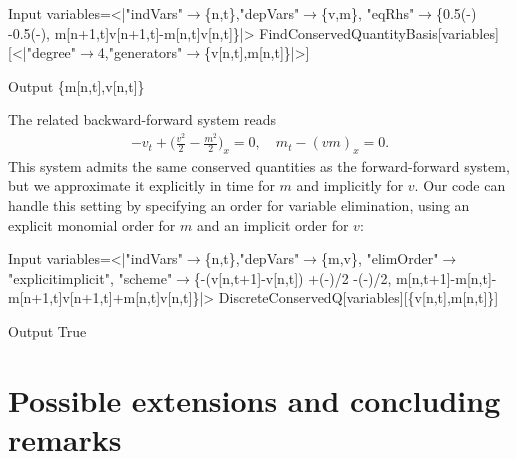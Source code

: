 \documentclass[runningheads]{llncs}
\newcommand{\1}{\chi}
\begin{document}
\begin{example}
	\begin{small}
		\begin{mmaCell}[moredefined={variables, PartialDVarD, FindConservedQuantityBasis}]{Input}
  variables=<|"indVars"\(\pmb{\to}\)\{n,t\},"depVars"\(\pmb{\to}\)\{v,m\},
  "eqRhs"\(\pmb{\to}\)\{0.5(-)
  -0.5(-),
  m[n+1,t]v[n+1,t]-m[n,t]v[n,t]\}|>
  FindConservedQuantityBasis[variables]
  [<|"degree"\(\pmb{\to}\)4,"generators"\(\pmb{\to}\)\{v[n,t],m[n,t]\}|>]
  
\end{mmaCell}
		\begin{mmaCell}{Output}
  \{m[n,t],v[n,t]\}
\end{mmaCell}
	\end{small}
\end{example}
\begin{example}
	The related backward-forward system reads
	\begin{gather*}
		-v_t+\Big(\frac{v^2}{2}-\frac{m^2}{2}\Big)_x=0,\quad
		m_t-(vm)_x=0.
	\end{gather*}
	This system admits the same conserved quantities as the forward-forward system, but we approximate it explicitly in time for \(m\) and implicitly for \(v\).
	Our code can handle this setting by specifying an order for variable elimination, using an explicit monomial order for \(m\) and an implicit order for \(v\):
	
	\begin{small}
		\begin{mmaCell}[moredefined={variables, DiscreteConservedQ}]{Input}
  variables=<|"indVars"\(\pmb{\to}\)\{n,t\},"depVars"\(\pmb{\to}\)\{m,v\},
  "elimOrder"\(\pmb{\to}\)"explicitimplicit",
  "scheme"\(\pmb{\to}\)\{-(v[n,t+1]-v[n,t])
  +(-)/2
  -(-)/2,
  m[n,t+1]-m[n,t]-m[n+1,t]v[n+1,t]+m[n,t]v[n,t]\}|>
  DiscreteConservedQ[variables][\{v[n,t],m[n,t]\}]
  
\end{mmaCell}
		\begin{mmaCell}{Output}
  True
\end{mmaCell}
	\end{small}
\end{example}
\section{Possible extensions and concluding remarks}
\end{document}
